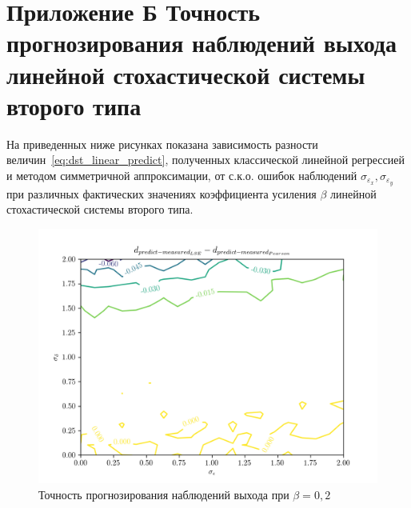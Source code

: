 \chapter*{%
  Приложение Б  \hspace{10cm}
  Точность прогнозирования наблюдений выхода
  линейной стохастической системы второго типа
}

\setcounter{section}{2}
\setcounter{figure}{0}
\setcounter{table}{0}
\setcounter{lstlisting}{0}

На приведенных ниже рисунках показана зависимость разности
величин~\eqref{eq:dst_linear_predict},
полученных классической линейной регрессией и методом симметричной аппроксимации,
от с.к.о. ошибок наблюдений \( \sigma_{\varepsilon_x}, \sigma_{\varepsilon_y} \) при
различных фактических значениях коэффициента усиления \( \beta \)
линейной стохастической системы второго типа.

\begin{figure}[h]
  \centering
  \includegraphics[width=150mm]{fig/linear/predict/beta-0,2_predict-measured.png}
  \caption{Точность прогнозирования наблюдений выхода при \( \beta = 0{,}2 \)}
\end{figure}


